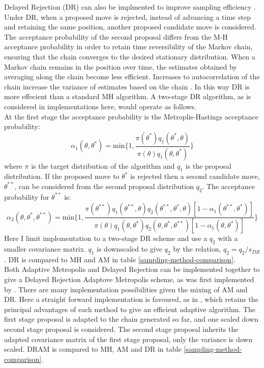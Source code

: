 Delayed Rejection (DR) can also be implmented to improve sampling efficiency \citet{Mira2001}. Under DR, when a proposed move is rejected, instead of advancing a time step and retaining the same position, another proposed candidate move is considered. The acceptance probability of the second proposal differs from the M-H acceptance probability in order to retain time reversibility of the Markov chain, ensuring that the chain converges to the desired stationary distribution. When a Markov chain remains in the position over time, the estimates obtained by averaging along the chain become less efficient. Increases to autocorrelation of the chain increase the variance of estimates based on the chain \citep{Mira2001}. In this way DR is more effecient than a standard MH algorithm. A two-stage DR algorithm, as is considered in implementations here, would operate as follows. \\

At the first stage the acceptance probability is the Metroplis-Hastings acceptance probability:
\begin{equation}
	\alpha_1(\theta,\theta^*) = \text{min}\bigg\{1,\frac{\pi(\theta^*)q_1(\theta^*,\theta)}{\pi(\theta)q_1(\theta,\theta^*)} \bigg\}
\end{equation}
where $\pi$ is the target distribution of the algorithm and $q_1$ is the proposal distribution. If the proposed move to $\theta^*$ is rejected then a second candidate move, $\theta^{**}$, can be considered from the second proposal distribution $q_2$. The acceptance probability for $\theta^{**}$ is:
\begin{equation}
	\alpha_2(\theta,\theta^*,\theta^{**}) = \text{min}\bigg\{1,\frac{\pi(\theta^{**})q_1(\theta^{**},\theta)q_2(\theta^{**},\theta^*,\theta)[1-\alpha_1(\theta^{**},\theta^*)]}{\pi(\theta)q_1(\theta,\theta^*)q_2(\theta,\theta^*,\theta^{**})[1-\alpha_1(\theta,\theta^*)]} \bigg\}
\end{equation}
Here I limit implementation to a two-stage DR scheme and use a $q_2$ with a smaller covariance matrix. $q_1$ is downscaled to give $q_2$ by the relation, $q_2 = q_2/s_{DR}$. DR is compared to MH and AM in table \ref{sampling-method-comparison}.\\

Both Adaptive Metropolis and Delayed Rejection can be implemented together to give a Delayed Rejection Adaptove Metropolis scheme, as was first implemented by \citet{Laine2008}. There are many implementation possibilities given the mixing of AM and DR. Here a straight forward implementation is favoured, as in \citet{Laine2008}, which retains the principal advantages of each method to give an efficient adaptive algorithm.    The first stage proposal is adapted to the chain generated so far, and one scaled down second stage proposal is considered. The second stage proposal inherits the adapted covariance matrix of the first stage proposal, only the variance is down scaled. DRAM is compared to MH, AM and DR in table \ref{sampling-method-comparison}.\\

